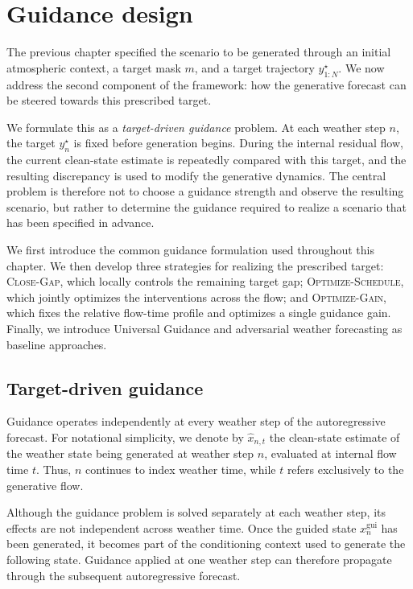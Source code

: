 
\chapter{Guidance design}
\label{ch:guide}

The previous chapter specified the scenario to be generated through an initial
atmospheric context, a target mask \(m\), and a target trajectory
\(y^\star_{1:N}\). We now address the second component of the framework:
how the generative forecast can be steered towards this prescribed target.

We formulate this as a \emph{target-driven guidance} problem. At each weather
step \(n\), the target \(y_n^\star\) is fixed before generation begins. During
the internal residual flow, the current clean-state estimate is repeatedly
compared with this target, and the resulting discrepancy is used to modify the
generative dynamics. The central problem is therefore not to choose a guidance
strength and observe the resulting scenario, but rather to determine the
guidance required to realize a scenario that has been specified in advance.

We first introduce the common guidance formulation used throughout this
chapter. We then develop three strategies for realizing the prescribed target:
\textsc{Close-Gap}, which locally controls the remaining target gap;
\textsc{Optimize-Schedule}, which jointly optimizes the interventions across
the flow; and \textsc{Optimize-Gain}, which fixes the relative flow-time
profile and optimizes a single guidance gain. Finally, we introduce Universal
Guidance and adversarial weather forecasting as baseline approaches.

\section{Target-driven guidance}
\label{sec:target-driven-guidance}

Guidance operates independently at every weather step of the autoregressive
forecast. For notational simplicity, we denote by
\(\hat{x}_{n,t}\) the clean-state estimate of the weather state being generated
at weather step \(n\), evaluated at internal flow time \(t\). Thus, \(n\)
continues to index weather time, while \(t\) refers exclusively to the
generative flow.

Although the guidance problem is solved separately at each weather step, its
effects are not independent across weather time. Once the guided state
\(x_n^{\mathrm{gui}}\) has been generated, it becomes part of the conditioning
context used to generate the following state. Guidance applied at one weather
step can therefore propagate through the subsequent autoregressive forecast.

